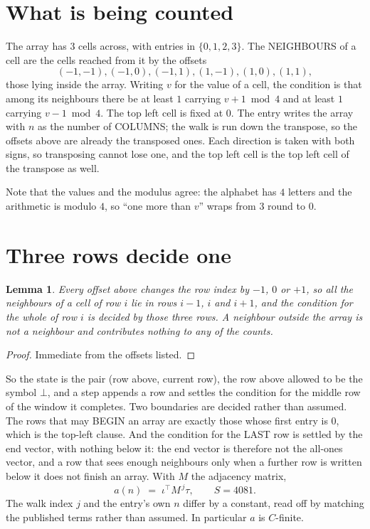 \documentclass[11pt,a4paper]{article}
\theoremstyle{plain}
\newtheorem{lemma}[theorem]{Lemma}
\theoremstyle{definition}
\begin{document}
\section{What is being counted}

The array has $3$ cells across, with entries in $\{0,1,2,3\}$. The NEIGHBOURS of a cell are the
cells reached from it by the offsets
\[
(-1,-1), (-1,0), (-1,1), (1,-1), (1,0), (1,1),
\]
those lying inside the array. Writing $v$ for the value of a cell, the condition is that among
its neighbours there be at least $1$ carrying $v+1 \bmod 4$ and at least $1$ carrying $v-1 \bmod 4$. The top left
cell is fixed at $0$. The entry writes the array with $n$ as the number of COLUMNS; the walk is run down the transpose, so the offsets above are already the transposed ones. Each direction is taken with both signs, so transposing cannot lose one, and the top left cell is the top left cell of the transpose as well.

Note that the values and the modulus agree: the alphabet has $4$ letters and the arithmetic
is modulo $4$, so ``one more than $v$'' wraps from $3$ round to $0$.

\section{Three rows decide one}

\begin{lemma}\label{lem:win}
Every offset above changes the row index by $-1$, $0$ or $+1$, so all the neighbours of a cell
of row $i$ lie in rows $i-1$, $i$ and $i+1$, and the condition for the whole of row $i$ is
decided by those three rows. A neighbour outside the array is not a neighbour and contributes
nothing to any of the counts.
\end{lemma}

\begin{proof}
Immediate from the offsets listed.
\end{proof}

So the state is the pair (row above, current row), the row above allowed to be the symbol
$\bot$, and a step appends a row and settles the condition for the middle row of the window it
completes. Two boundaries are decided rather than assumed. The rows that may BEGIN an array are
exactly those whose first entry is $0$, which is the top-left clause. And the condition for the
LAST row is settled by the end vector, with nothing below it: the end vector is therefore not
the all-ones vector, and a row that sees enough neighbours only when a further row is written
below it does not finish an array. With $M$ the adjacency matrix,
\[
a(n)\;=\;\iota^{\!\top}M^{\,j}\tau ,\qquad S=4081.
\]
The walk index $j$ and the entry's own $n$ differ by a constant, read off by matching the
published terms rather than assumed. In particular $a$ is $C$-finite.
\end{document}
